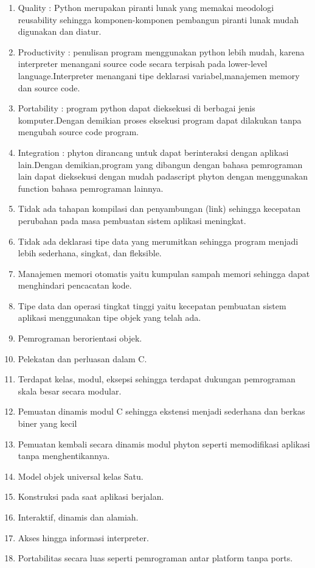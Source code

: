 \begin{enumerate}
\item Quality : Python merupakan piranti lunak yang memakai meodologi reusability sehingga komponen-komponen pembangun piranti      lunak mudah digunakan dan diatur.
\item Productivity : penulisan program menggunakan python lebih mudah, karena interpreter menangani source code secara terpisah pada lower-level language.Interpreter menangani tipe deklarasi variabel,manajemen memory dan source code.
\item Portability : program python dapat dieksekusi di berbagai jenis komputer.Dengan demikian proses eksekusi program dapat dilakukan tanpa mengubah source code program.
\item Integration : phyton dirancang untuk dapat berinteraksi dengan aplikasi lain.Dengan demikian,program yang dibangun dengan bahasa pemrograman lain dapat dieksekusi dengan mudah padascript phyton dengan menggunakan function bahasa pemrograman lainnya.
\item Tidak ada tahapan kompilasi dan penyambungan (link) sehingga kecepatan perubahan pada masa pembuatan sistem aplikasi meningkat.
\item Tidak ada deklarasi tipe data yang merumitkan sehingga program menjadi lebih sederhana, singkat, dan fleksible.
\item Manajemen memori otomatis yaitu kumpulan sampah memori sehingga dapat menghindari pencacatan kode.
\item Tipe data dan operasi tingkat tinggi yaitu kecepatan pembuatan sistem aplikasi menggunakan tipe objek yang telah ada.
\item Pemrograman berorientasi objek.
\item Pelekatan dan perluasan dalam C.
\item Terdapat kelas, modul, eksepsi sehingga terdapat dukungan pemrograman skala besar secara modular.
\item Pemuatan dinamis modul C sehingga ekstensi menjadi sederhana dan berkas biner yang kecil
\item Pemuatan kembali secara dinamis modul phyton seperti memodifikasi aplikasi tanpa menghentikannya.
\item Model objek universal kelas Satu.
\item Konstruksi pada saat aplikasi berjalan.
\item Interaktif, dinamis dan alamiah.
\item Akses hingga informasi interpreter.
\item Portabilitas secara luas seperti pemrograman antar platform tanpa ports.

\end{enumerate}

